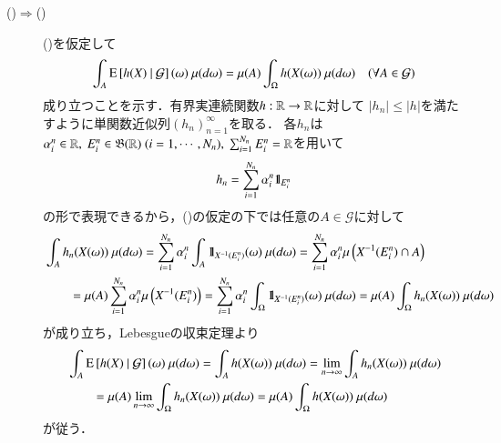 \begin{prf}
\begin{description}
			\item[()$\Rightarrow$()]
				()を仮定して
				\begin{align}
					\int_A \cexp{h(X)}{\mathcal{G}}(\omega)\ \mu(d\omega) 
					= \mu(A) \int_\Omega h(X(\omega))\ \mu(d\omega)
					\quad (\forall A \in \mathcal{G})
				\end{align}
				成り立つことを示す．有界実連続関数$h:\mathbb{R} \rightarrow \mathbb{R}$に対して
				$|h_n| \leq |h|$を満たすように単関数近似列$(h_n)_{n=1}^{\infty}$を取る．
				各$h_n$は$\alpha_i^n \in \R,\ E_i^n \in \borel{\R}\ (i=1,\cdots,N_n),\ \sum_{i=1}^{N_n}E_i^n = \R$を用いて
				\begin{align}
					h_n = \sum_{i=1}^{N_n} \alpha_i^n \mbox{1}\hspace{-0.25em}\mbox{l}_{E_i^n}
				\end{align}
				の形で表現できるから，()の仮定の下では任意の$A \in \mathcal{G}$に対して
				\begin{align}
					&\int_A h_n(X(\omega))\ \mu(d\omega)
					= \sum_{i=1}^{N_n} \alpha_i^n \int_A \mbox{1}\hspace{-0.25em}\mbox{l}_{X^{-1}(E_i^n)}(\omega)\ \mu(d\omega)
					= \sum_{i=1}^{N_n} \alpha_i^n \mu\left( X^{-1}(E_i^n) \cap A \right) \\
					&\qquad = \mu(A) \sum_{i=1}^{N_n} \alpha_i^n \mu\left( X^{-1}(E_i^n) \right)
					= \sum_{i=1}^{N_n} \alpha_i^n \int_\Omega \mbox{1}\hspace{-0.25em}\mbox{l}_{X^{-1}(E_i^n)}(\omega)\ \mu(d\omega)
					= \mu(A) \int_\Omega h_n(X(\omega))\ \mu(d\omega)
				\end{align}
				が成り立ち，Lebesgueの収束定理より
				\begin{align}
					&\int_A \cexp{h(X)}{\mathcal{G}}(\omega)\ \mu(d\omega)
					= \int_A h(X(\omega))\ \mu(d\omega)
					= \lim_{n \to \infty} \int_A h_n(X(\omega))\ \mu(d\omega) \\
					&\qquad = \mu(A) \lim_{n \to \infty} \int_{\Omega} h_n(X(\omega))\ \mu(d\omega)
					= \mu(A) \int_{\Omega} h(X(\omega))\ \mu(d\omega)
				\end{align}
				が従う．
				\QED
		\end{description}
	\end{prf}

